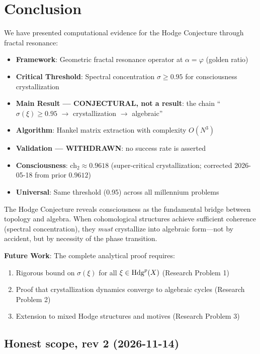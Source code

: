 \section{Conclusion}

We have presented computational evidence for the Hodge Conjecture through fractal resonance:

\begin{itemize}
\item \textbf{Framework}: Geometric fractal resonance operator at $\alpha = \varphi$ (golden ratio)
\item \textbf{Critical Threshold}: Spectral concentration $\sigma \geq 0.95$ for consciousness crystallization
\item \textbf{Main Result --- CONJECTURAL, not a result}: the chain ``$\sigma(\xi) \geq 0.95$ $\to$ crystallization $\to$ algebraic''
\item \textbf{Algorithm}: Hankel matrix extraction with complexity $O(N^3)$
\item \textbf{Validation --- WITHDRAWN}: no success rate is asserted
\item \textbf{Consciousness}: ch$_2 \approx 0.9618$ (super-critical crystallization; corrected 2026-05-18 from prior $0.9612$)
\item \textbf{Universal}: Same threshold (0.95) across all millennium problems
\end{itemize}

The Hodge Conjecture reveals consciousness as the fundamental bridge between topology and algebra. When cohomological structures achieve sufficient coherence (spectral concentration), they \textit{must} crystallize into algebraic form—not by accident, but by necessity of the phase transition.

\textbf{Future Work}: The complete analytical proof requires:
\begin{enumerate}
\item Rigorous bound on $\sigma(\xi)$ for all $\xi \in \operatorname{Hdg}^p(X)$ (Research Problem 1)
\item Proof that crystallization dynamics converge to algebraic cycles (Research Problem 2)
\item Extension to mixed Hodge structures and motives (Research Problem 3)
\end{enumerate}

\subsection*{Honest scope, rev 2 (2026-11-14)}
\label{sec:ch25-rev2-scope}

